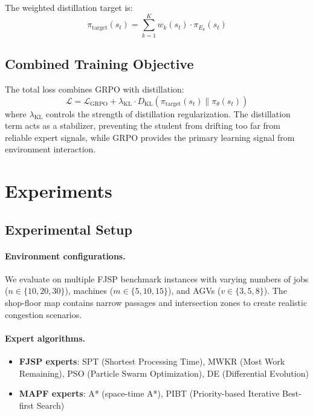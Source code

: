 \documentclass[11pt,a4paper]{article}
\begin{document}
The weighted distillation target is:
\begin{equation}
    \pi_{\text{target}}(s_t) = \sum_{k=1}^{K} w_k(s_t) \cdot \pi_{E_k}(s_t)
\end{equation}

\subsection{Combined Training Objective}

The total loss combines GRPO with distillation:
\begin{equation}
    \mathcal{L} = \mathcal{L}_{\text{GRPO}} + \lambda_{\text{KL}} \cdot D_{\text{KL}}\left(\pi_{\text{target}}(s_t) \| \pi_\theta(s_t)\right)
\end{equation}
where $\lambda_{\text{KL}}$ controls the strength of distillation regularization. The distillation term acts as a stabilizer, preventing the student from drifting too far from reliable expert signals, while GRPO provides the primary learning signal from environment interaction.


\section{Experiments}
\label{sec:experiments}

\subsection{Experimental Setup}

\paragraph{Environment configurations.}
We evaluate on multiple FJSP benchmark instances with varying numbers of jobs ($n \in \{10, 20, 30\}$), machines ($m \in \{5, 10, 15\}$), and AGVs ($v \in \{3, 5, 8\}$). The shop-floor map contains narrow passages and intersection zones to create realistic congestion scenarios.

\paragraph{Expert algorithms.}
\begin{itemize}[leftmargin=*]
    \item \textbf{FJSP experts}: SPT (Shortest Processing Time), MWKR (Most Work Remaining), PSO (Particle Swarm Optimization), DE (Differential Evolution)
    \item \textbf{MAPF experts}: A* (space-time A*), PIBT (Priority-based Iterative Best-first Search)
\end{itemize}
\end{document}
